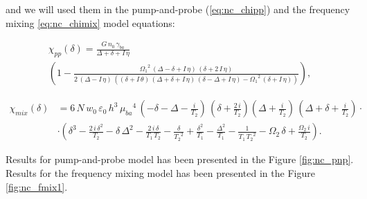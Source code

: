 \documentclass[12pt,twoside,a4paper]{article}
\numberwithin{equation}{subsection}
\numberwithin{figure}{subsection}
\begin{document}
and we will used them in the pump-and-probe (\ref{eq:nc_chipp}) and the frequency mixing \ref{eq:nc_chimix} model equations:

\begin{multline} \label{eq:nc_chipp}
  \chi_{pp}(\delta ) = 
  \frac {G\,{n_{0}}\,{\gamma_{ba}}}{\Delta  + \delta  + I\,\eta }
  \\ 
  \left(
      1 - \frac{{\Omega_{1}}^{2}\,(\Delta - \delta  + I\,\eta )\,(\delta  + 2\,I\,\eta )}
                {2\,(\Delta  - I\,\eta )\,((\delta  + I\,\theta)\,(\Delta  + \delta  + I\,\eta )\, (\delta  - \Delta  + I\,\eta ) 
                   - {\Omega_{1}}^{2}\,(\delta  + I\,\eta ))} 
  \right) ,
\end{multline}

\begin{align} \label{eq:nc_chimix}
  {\chi_{mix}}(\delta ) 
    &= 6\,N\,{w_{0}}\,\varepsilon_0\,h^{3}\,{\mu_{\mathit{ba}}}^{4}
      \,( - \delta  - \Delta  - \frac {i}{{T_{2}}})
      \,(\delta  + \frac{2\,i}{{T_{2}}}) (\Delta  + \frac {i}{{T_{2}}})\,(\Delta  + \delta  + \frac{i}{{T_{2}}})\cdot \\
    & \cdot	(\delta ^{3} - \frac {2\,i\,\delta ^{2}}{{T_{2}}} - \delta \,\Delta ^{2} - \frac {2\,i\,\delta }{{T_{1}}\,{T_{2}}}
      - \frac {\delta }{{T_{2}}^{2}} + \frac {\delta ^{2}}{{T_{1}}} - \frac {\Delta ^{2}}{{T_{1}}} - \frac {1}{{T_{1}}\,{T_{2}}^{2}} -
      {\Omega_{2}}\,\delta  + \frac {{\Omega_{2}}\,i}{{T_{2}}}) .
  \nonumber
\end{align}

Results for pump-and-probe model has been presented in the Figure \ref{fig:nc_pnp}. Results for the frequency mixing model has been
presented in the Figure \ref{fig:nc_fmix1}. 
\end{document}
